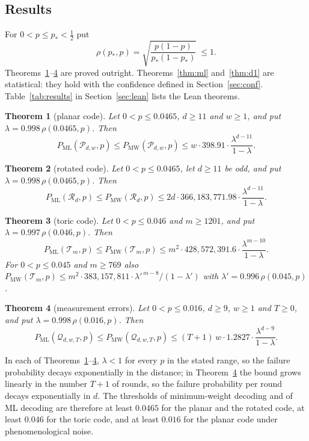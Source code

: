 \documentclass[11pt]{amsart}
\newtheorem{theorem}{Theorem}[section]
\theoremstyle{definition}
\theoremstyle{remark}
\numberwithin{equation}{section}
\newcommand{\PML}{P_{\mathrm{ML}}}
\newcommand{\PMW}{P_{\mathrm{MW}}}
\begin{document}
\subsection{Results}\label{sec:results}
For $0<p\le p_\ast<\tfrac12$ put
\[
\rho(p_\ast,p)=\sqrt{\frac{p(1-p)}{p_\ast(1-p_\ast)}}\ \le 1 .
\]
Theorems~\ref{thm:planar}--\ref{thm:phenom} are proved outright. Theorems~\ref{thm:ml} and~\ref{thm:d1} are statistical: they hold with the confidence defined in Section~\ref{sec:conf}. Table~\ref{tab:results} in Section~\ref{sec:lean} lists the Lean theorems.

\begin{theorem}[planar code]\label{thm:planar}
Let $0<p\le0.0465$, $d\ge11$ and $w\ge1$, and put $\lambda=0.998\,\rho(0.0465,p)$. Then
\[
\PML(\mathcal P_{d,w},p)\le\PMW(\mathcal P_{d,w},p)\le w\cdot398.91\cdot\frac{\lambda^{d-11}}{1-\lambda}.
\]\end{theorem}

\begin{theorem}[rotated code]\label{thm:rotated}
Let $0<p\le0.0465$, let $d\ge11$ be odd, and put $\lambda=0.998\,\rho(0.0465,p)$. Then
\[
\PML(\mathcal R_d,p)\le\PMW(\mathcal R_d,p)\le 2d\cdot366{,}183{,}771.98\cdot\frac{\lambda^{d-11}}{1-\lambda}.
\]
\end{theorem}

\begin{theorem}[toric code]\label{thm:toric}
Let $0<p\le0.046$ and $m\ge1201$, and put $\lambda=0.997\,\rho(0.046,p)$. Then
\[
\PML(\mathcal T_m,p)\le\PMW(\mathcal T_m,p)\le m^2\cdot428{,}572{,}391.6\cdot\frac{\lambda^{m-10}}{1-\lambda}.
\]
For $0<p\le0.045$ and $m\ge769$ also $\PMW(\mathcal T_m,p)\le m^2\cdot383{,}157{,}811\cdot\lambda'^{\,m-8}/(1-\lambda')$ with $\lambda'=0.996\,\rho(0.045,p)$.
\end{theorem}

\begin{theorem}[measurement errors]\label{thm:phenom}
Let $0<p\le0.016$, $d\ge9$, $w\ge1$ and $T\ge0$, and put $\lambda=0.998\,\rho(0.016,p)$. Then
\[
\PML(\mathcal Q_{d,w,T},p)\le\PMW(\mathcal Q_{d,w,T},p)\le (T+1)\,w\cdot1.2827\cdot\frac{\lambda^{d-9}}{1-\lambda}.
\]\end{theorem}

In each of Theorems~\ref{thm:planar}--\ref{thm:phenom}, $\lambda<1$ for every $p$ in the stated range, so the failure probability decays exponentially in the distance; in Theorem~\ref{thm:phenom} the bound grows linearly in the number $T+1$ of rounds, so the failure probability per round decays exponentially in $d$. The thresholds of minimum-weight decoding and of ML decoding are therefore at least $0.0465$ for the planar and the rotated code, at least $0.046$ for the toric code, and at least $0.016$ for the planar code under phenomenological noise.
\end{document}
